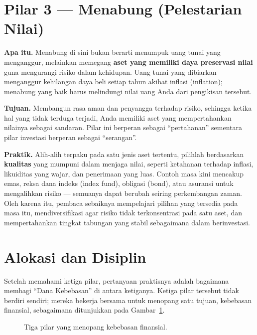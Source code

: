 \documentclass[10pt,a4paper,twocolumn]{article}
\begin{document}
\section{Pilar 3 --- Menabung (Pelestarian Nilai)}
\textbf{Apa itu.} Menabung di sini bukan berarti menumpuk uang tunai yang menganggur, melainkan memegang \textbf{aset yang memiliki daya preservasi nilai} guna mengurangi risiko dalam kehidupan. Uang tunai yang dibiarkan menganggur kehilangan daya beli setiap tahun akibat inflasi (inflation); menabung yang baik harus melindungi nilai uang Anda dari pengikisan tersebut.

\textbf{Tujuan.} Membangun rasa aman dan penyangga terhadap risiko, sehingga ketika hal yang tidak terduga terjadi, Anda memiliki aset yang mempertahankan nilainya sebagai sandaran. Pilar ini berperan sebagai ``pertahanan'' sementara pilar investasi berperan sebagai ``serangan''.

\textbf{Praktik.} Alih-alih terpaku pada satu jenis aset tertentu, pilihlah berdasarkan \textbf{kualitas} yang mumpuni dalam menjaga nilai, seperti ketahanan terhadap inflasi, likuiditas yang wajar, dan penerimaan yang luas. Contoh masa kini mencakup emas, reksa dana indeks (index fund), obligasi (bond), atau asuransi untuk mengalihkan risiko --- semuanya dapat berubah seiring perkembangan zaman. Oleh karena itu, pembaca sebaiknya mempelajari pilihan yang tersedia pada masa itu, mendiversifikasi agar risiko tidak terkonsentrasi pada satu aset, dan mempertahankan tingkat tabungan yang stabil sebagaimana dalam berinvestasi.

\section{Alokasi dan Disiplin}
Setelah memahami ketiga pilar, pertanyaan praktisnya adalah bagaimana membagi ``Dana Kebebasan'' di antara ketiganya. Ketiga pilar tersebut tidak berdiri sendiri; mereka bekerja bersama untuk menopang satu tujuan, kebebasan finansial, sebagaimana ditunjukkan pada Gambar~\ref{fig:pillars}.

\begin{figure}[t]
\centering
{}
\caption{Tiga pilar yang menopang kebebasan finansial.}
\label{fig:pillars}
\end{figure}
\end{document}
